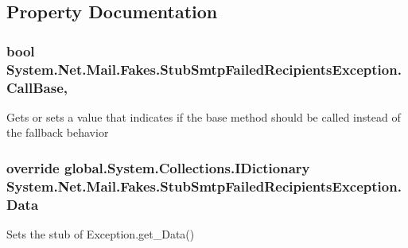 \subsection{Property Documentation}
\hypertarget{class_system_1_1_net_1_1_mail_1_1_fakes_1_1_stub_smtp_failed_recipients_exception_aaa14d1201daf124c05c4a17119042aa0}{
\subsubsection[{Call\-Base}]{\setlength{\rightskip}{0pt plus 5cm}bool System.\-Net.\-Mail.\-Fakes.\-Stub\-Smtp\-Failed\-Recipients\-Exception.\-Call\-Base\hspace{0.3cm}{\ttfamily [get]}, {\ttfamily [set]}}}\label{class_system_1_1_net_1_1_mail_1_1_fakes_1_1_stub_smtp_failed_recipients_exception_aaa14d1201daf124c05c4a17119042aa0}


Gets or sets a value that indicates if the base method should be called instead of the fallback behavior

\hypertarget{class_system_1_1_net_1_1_mail_1_1_fakes_1_1_stub_smtp_failed_recipients_exception_a05c0752c3be5f1fd9d8f476140329f4d}{
\subsubsection[{Data}]{\setlength{\rightskip}{0pt plus 5cm}override global.\-System.\-Collections.\-I\-Dictionary System.\-Net.\-Mail.\-Fakes.\-Stub\-Smtp\-Failed\-Recipients\-Exception.\-Data\hspace{0.3cm}{\ttfamily [get]}}}\label{class_system_1_1_net_1_1_mail_1_1_fakes_1_1_stub_smtp_failed_recipients_exception_a05c0752c3be5f1fd9d8f476140329f4d}


Sets the stub of Exception.\-get\-\_\-\-Data()

